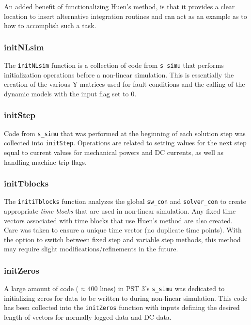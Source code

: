 An added benefit of functionalizing Huen's method, is that it provides a clear location to insert alternative integration routines and can act as an example as to how to accomplish such a task.

\subsubsection{initNLsim}  
The \verb|initNLsim| function is a collection of code from \verb|s_simu| that performs initialization operations before a non-linear simulation.
This is essentially the creation of the various Y-matrices used for fault conditions and the calling of the dynamic models with the input flag set to 0.

\subsubsection{initStep}  
Code from \verb|s_simu| that was performed at the beginning of each solution step was collected into \verb|initStep|.
Operations are related to setting values for the next step equal to current values for mechanical powers and DC currents, as well as handling machine trip flags.

\subsubsection{initTblocks}  
The \verb|initiTblocks| function analyzes the global \verb|sw_con| and \verb|solver_con| to create appropriate \emph{time blocks} that are used in non-linear simulation.
Any fixed time vectors associated with time blocks that use Huen's method are also created.
Care was taken to ensure a unique time vector (no duplicate time points).
With the option to switch between fixed step and variable step  methods, this method may require slight modifications/refinements in the future.

\subsubsection{initZeros}  
A large amount of code ($\approx$400 lines) in PST 3's \verb|s_simu| was dedicated to initializing zeros for data to be written to during non-linear simulation.
This code has been collected into the \verb|initZeros| function with inputs defining the desired length of vectors for normally logged data and DC data.

